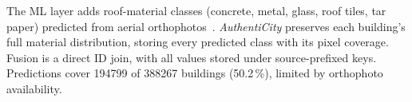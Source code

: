 \documentclass[sigconf,authordraft]{acmart}
\newcommand{\benchname}{\textit{Authenti\-City}}
\begin{document}
The ML layer adds roof-material classes (concrete, metal, glass, roof tiles, tar paper) predicted from aerial orthophotos~\cite{lukas_roofmaterials}. 
\benchname{} preserves each building's full material distribution, storing every predicted class with its pixel coverage. 
Fusion is a direct ID join, with all values stored under source-prefixed keys. Predictions cover \num{194799} of \num{388267} buildings (50.2\,\%), limited by orthophoto availability. 
\end{document}
